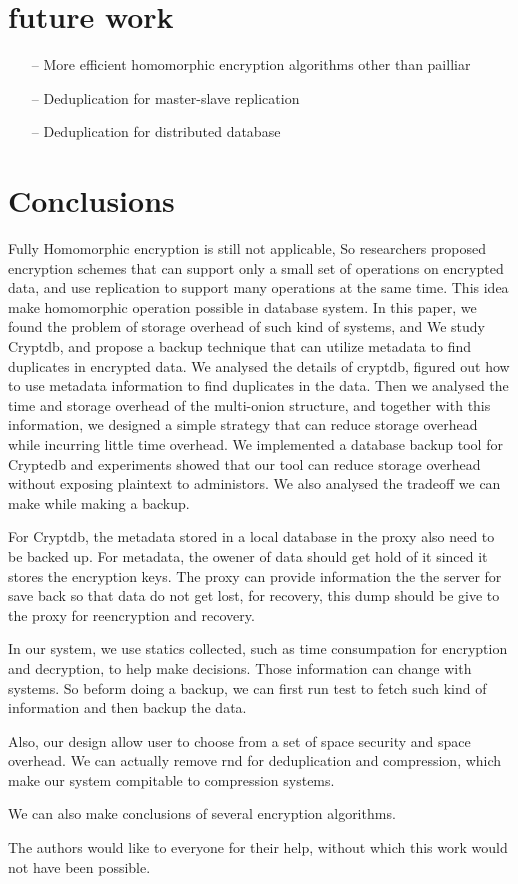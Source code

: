 \section{future work}

\begin{itemize}
\item[--] More efficient homomorphic encryption algorithms other than pailliar
\item[--] Deduplication for master-slave replication
\item[--] Deduplication for distributed database
\end{itemize}



\section{Conclusions}

Fully Homomorphic encryption is still not applicable, So researchers proposed encryption schemes that can support only a small set of operations on encrypted data, and use replication to support many operations at the same time. This idea make homomorphic operation possible in database system. In this paper, we found the problem of storage overhead of such kind of systems, and We study Cryptdb, and propose a backup technique that can utilize metadata to find duplicates in encrypted data. We analysed the details of cryptdb, figured out how to use metadata information to find duplicates in the data. Then we analysed the time and storage overhead of the multi-onion structure, and together with this information, we designed a simple strategy that can reduce storage overhead while incurring little time overhead. We implemented a database backup tool for Cryptedb and experiments showed that our tool can reduce storage overhead without exposing plaintext to administors. We also analysed the tradeoff we can make while making a backup.

For Cryptdb, the metadata stored in a local database in the proxy also need to be backed up. For metadata, the owener of data should get hold of it sinced it stores the encryption keys. The proxy can provide information the the server for save back so that data do not get lost, for recovery, this dump should be give to the proxy for reencryption and recovery.


In our system, we use statics collected, such as time consumpation for encryption and decryption, to help make decisions. Those information can change with systems. So beform doing a backup, we can first run test to fetch such kind of information and then backup the data.

Also, our design allow user to choose from a set of space security and space overhead. We can actually remove rnd for deduplication and compression, which make our system compitable to compression systems.

We can also make conclusions of several encryption algorithms.


\begin{acks}
  The authors would like to everyone for their help, without which this work would not have been possible. 
\end{acks}